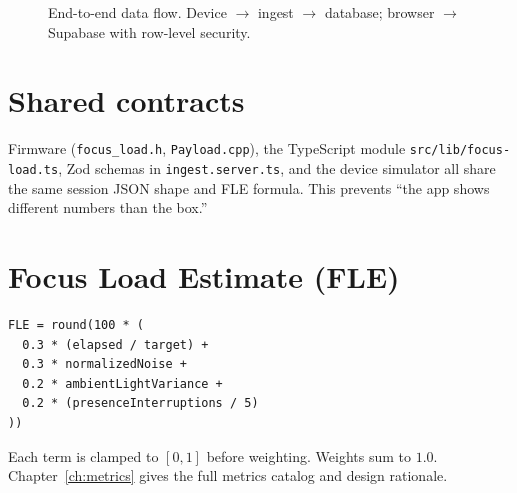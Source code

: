 \documentclass[11pt,a4paper]{report}
\newcommand{\filepath}[1]{\texttt{#1}}
\begin{document}
\begin{figure}[h]
\centering
{}
\caption{End-to-end data flow. Device $\rightarrow$ ingest $\rightarrow$ database; browser $\rightarrow$ Supabase with row-level security.}
\end{figure}

\section{Shared contracts}

Firmware (\filepath{focus\_load.h}, \filepath{Payload.cpp}), the TypeScript module
\filepath{src/lib/focus-load.ts}, Zod schemas in \filepath{ingest.server.ts}, and the
device simulator all share the same session JSON shape and FLE formula. This prevents
``the app shows different numbers than the box.''

\section{Focus Load Estimate (FLE)}

\begin{lstlisting}
FLE = round(100 * (
  0.3 * (elapsed / target) +
  0.3 * normalizedNoise +
  0.2 * ambientLightVariance +
  0.2 * (presenceInterruptions / 5)
))
\end{lstlisting}

Each term is clamped to $[0,1]$ before weighting. Weights sum to $1.0$.
Chapter~\ref{ch:metrics} gives the full metrics catalog and design rationale.
\end{document}
